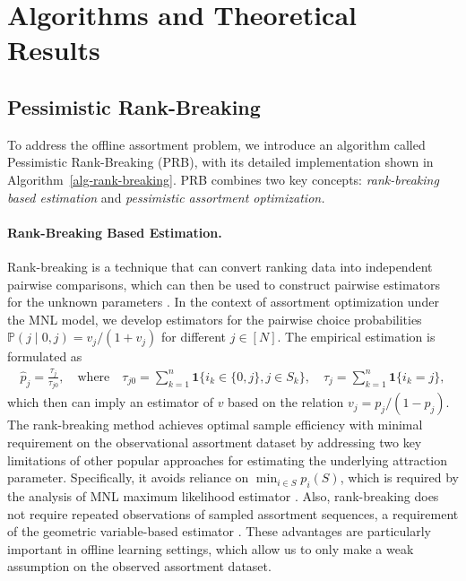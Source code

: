 \documentclass[10pt, letterpaper]{article}
\begin{document}
\section{Algorithms and Theoretical Results}


\subsection{Pessimistic Rank-Breaking}

To address the offline assortment problem, we introduce an algorithm called Pessimistic Rank-Breaking (PRB), with its detailed implementation shown in Algorithm~\ref{alg-rank-breaking}. PRB combines two key concepts: \textit{rank-breaking based estimation} and \textit{pessimistic assortment optimization.}

\paragraph{Rank-Breaking Based Estimation.} 
Rank-breaking is a technique that can convert ranking data into independent pairwise comparisons, which can then be used to construct pairwise estimators for the unknown parameters \citep{saha2019active,saha2024stop}. 
In the context of assortment optimization under the MNL model, we develop estimators for the pairwise choice probabilities $\mathbb{P}(j \mid {0, j}) = v_j/(1 + v_j)$ for different $j\in[N]$. 
The empirical estimation is formulated as
\begin{align*}
    \widehat{p}_j = \frac{\tau_j}{\tau_{j0}}, \quad \text{where} \quad \tau_{j0} = \sum_{k=1}^n \mathbf{1}\big\{i_k \in \{0, j\}, j \in S_k\big\}, \quad \tau_j = \sum_{k=1}^n \mathbf{1}\{i_k = j\},
\end{align*}
which then can imply an estimator of $v$ based on the relation $v_j = p_j/(1-p_j)$. 
The rank-breaking method achieves optimal sample efficiency with minimal requirement on the observational assortment dataset by addressing two key limitations of other popular approaches for estimating the underlying attraction parameter. Specifically, it avoids reliance on $\min_{i \in S} p_i(S)$, which is required by the analysis of MNL maximum likelihood estimator \citep{oh2021multinomial,perivier2022dynamic,lee2024nearly}.
Also, rank-breaking does not require repeated observations of sampled assortment sequences, a requirement of the geometric variable-based estimator \citep{agrawal2017thompson,agrawal2019mnl}. These advantages are particularly important in offline learning settings, which allow us to only make a weak assumption on the observed assortment dataset.
\end{document}

